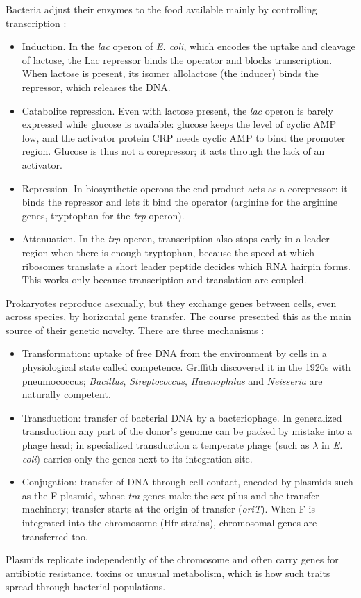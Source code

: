 Bacteria adjust their enzymes to the food
available mainly by controlling transcription
\cite[Sections 8.3--8.5 and
8.16]{madigan2012brock}:
\begin{itemize}
\item Induction. In the \emph{lac} operon of
\emph{E. coli}, which encodes the uptake and
cleavage of lactose, the Lac repressor binds
the operator and blocks transcription. When
lactose is present, its isomer allolactose
(the inducer) binds the repressor, which
releases the DNA.
\item Catabolite repression. Even with
lactose present, the \emph{lac} operon is
barely expressed while glucose is available:
glucose keeps the level of cyclic AMP low,
and the activator protein CRP needs cyclic
AMP to bind the promoter region. Glucose is
thus not a corepressor; it acts through the
lack of an activator.
\item Repression. In biosynthetic operons the
end product acts as a corepressor: it binds
the repressor and lets it bind the operator
(arginine for the arginine genes, tryptophan
for the \emph{trp} operon).
\item Attenuation. In the \emph{trp} operon,
transcription also stops early in a leader
region when there is enough tryptophan,
because the speed at which ribosomes
translate a short leader peptide decides
which RNA hairpin forms. This works only
because transcription and translation are
coupled.
\end{itemize}

Prokaryotes reproduce asexually, but they
exchange genes between cells, even across
species, by horizontal gene transfer. The
course presented this as the main source of
their genetic novelty. There are three
mechanisms \cite[Sections
10.7--10.9]{madigan2012brock}:
\begin{itemize}
\item Transformation: uptake of free DNA from
the environment by cells in a physiological
state called competence. Griffith discovered
it in the 1920s with pneumococcus;
\emph{Bacillus}, \emph{Streptococcus},
\emph{Haemophilus} and \emph{Neisseria} are
naturally competent.
\item Transduction: transfer of bacterial DNA
by a bacteriophage. In generalized
transduction any part of the donor's genome
can be packed by mistake into a phage head;
in specialized transduction a temperate phage
(such as $\lambda$ in \emph{E. coli}) carries
only the genes next to its integration site.
\item Conjugation: transfer of DNA through
cell contact, encoded by plasmids such as the
F plasmid, whose \emph{tra} genes make the
sex pilus and the transfer machinery;
transfer starts at the origin of transfer
(\emph{oriT}). When F is integrated into the
chromosome (Hfr strains), chromosomal genes
are transferred too.
\end{itemize}
Plasmids replicate independently of the
chromosome and often carry genes for
antibiotic resistance, toxins or unusual
metabolism, which is how such traits spread
through bacterial populations.

